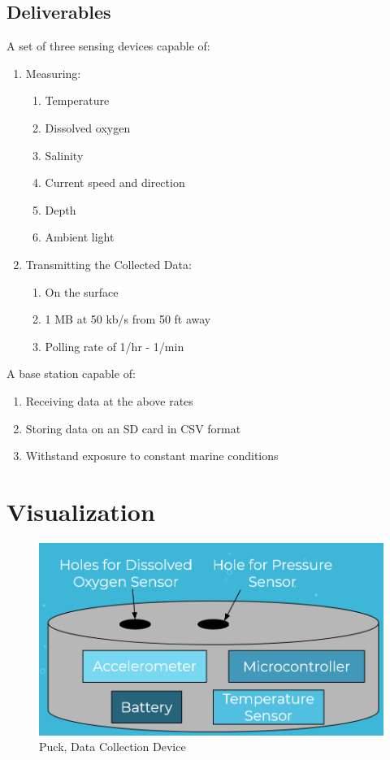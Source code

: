 \documentclass[12pt]{article}         %
\begin{document}
\subsection{Deliverables}

A set of three sensing devices capable of: 
\begin{enumerate}
    \item Measuring:
    \begin{enumerate}
        \item Temperature
        \item Dissolved oxygen
        \item Salinity
        \item Current speed and direction
        \item Depth
        \item Ambient light
    \end{enumerate}
    \item Transmitting the Collected Data:
    \begin{enumerate}
        \item On the surface
        \item 1 MB at 50 kb/s from 50 ft away
        \item Polling rate of 1/hr - 1/min
    \end{enumerate}
\end{enumerate}

A base station capable of: 
\begin{enumerate}
    \item Receiving data at the above rates
    \item Storing data on an SD card in CSV format
    \item Withstand exposure to constant marine conditions
\end{enumerate}

\section{Visualization}  %

\begin{figure}[h]
    \centering
    \includegraphics[scale=0.6]{puck}
    \caption{Puck, Data Collection Device}
    \label{fig:my_label}
\end{figure}
\end{document}
